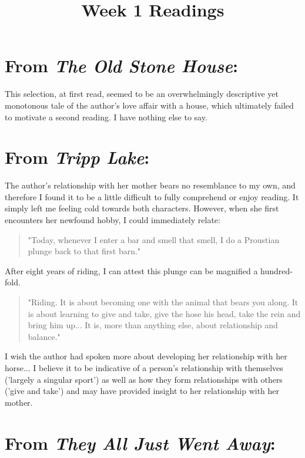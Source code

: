 \documentclass[letterpaper]{article}
\title{Week 1 Readings}
\date{}
\begin{document}
	\maketitle
	\thispagestyle{empty}
	\onehalfspacing
   \section{From \emph{The Old Stone House}:}
   This selection, at first read, seemed to be an overwhelmingly descriptive yet monotonous tale of the author's love affair with a house, which ultimately failed to motivate a second reading. I have nothing else to say.

   \section{From \emph{Tripp Lake}:}

   The author's relationship with her mother bears no resemblance to my own, and therefore I found it to be a little difficult to fully comprehend or enjoy reading. It simply left me feeling cold towards both characters. However, when she first encounters her newfound hobby, I could immediately relate:

   \begin{quote}
      "Today, whenever I enter a bar and smell that smell, I do a Proustian plunge back to that first barn."
   \end{quote}

   After eight years of riding, I can attest this plunge can be magnified a hundred-fold. 

   \begin{quote}
   "Riding. It is about becoming one with the animal that bears you along.  It is about learning to give and take, give the hose his head, take the rein and bring him up... It is, more than anything else, about relationship and balance."
   \end{quote}

   I wish the author had spoken more about developing her relationship with her horse... I believe it to be indicative of a person's relationship with themselves ('largely a singular sport') as well as how they form relationships with others ('give and take') and may have provided insight to her relationship with her mother.

   \section{From \emph{They All Just Went Away}:}
\end{document}
